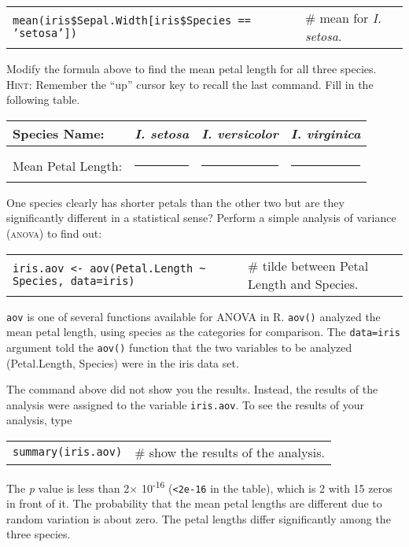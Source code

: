 \documentclass[11pt]{article}
\begin{document}
\begin{tabular}{@{}L{4in}L{2in}@{}}
\texttt{mean(iris\$Sepal.Width{[}iris\$Species == 'setosa'{]})} & \# mean for
\emph{I. setosa}. 
\end{tabular}

Modify the formula above to  find the mean petal length for all three species. \textsc{Hint:} Remember the ``up'' cursor key to recall the last command. Fill in the following table.


\begin{longtable}[l]{@{}lccc@{}}
\toprule
Species Name: & \emph{I. setosa} & \emph{I. versicolor} & \emph{I.
virginica}\tabularnewline
\midrule
&&&\tabularnewline[1ex]
Mean Petal Length: & \rule{1in}{0.4pt} & \rule{1in}{0.4pt}  & \rule{1in}{0.4pt} \tabularnewline
\bottomrule
\end{longtable}

One species clearly has shorter petals than the other two but are they
significantly different in a statistical sense? Perform a simple
analysis of variance \textsc{(anova)} to find out:

\begin{tabular}{@{}L{4in}L{1.5in}@{}}
\texttt{iris.aov \textless{}- aov(Petal.Length \textasciitilde{} Species,
data=iris)} &  \# tilde between Petal Length and Species.\\
\end{tabular}

\texttt{aov} is one of several functions available for ANOVA in R. \texttt{aov()} analyzed
the mean petal length, using species as the categories for comparison.
The \texttt{data=iris} argument told the \texttt{aov()} function that the two variables to
be analyzed (Petal.Length, Species) were in the iris data set.

The command above did not show you the results. Instead, the results of
the analysis were assigned to the variable \texttt{iris.aov}. To see the results
of your analysis, type

\begin{tabular}{@{}L{1.5in}L{4in}@{}}
\texttt{summary(iris.aov)} & \# show the results of the analysis. \\
\end{tabular}

The \emph{p} value is less than 2$\times$ 10\textsuperscript{-16}
(\texttt{\textless{}2e-16} in the table), which is 2 with 15 zeros in front of
it. The probability that the mean petal lengths are different due to
random variation is about zero. The petal lengths differ significantly
among the three species.
\end{document}
